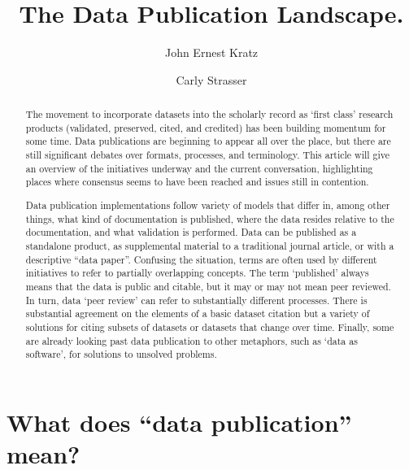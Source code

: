 \documentclass[10pt,a4paper,twocolumn]{article}
\begin{document}
\title{The Data Publication Landscape.}
\author[1]{John Ernest Kratz}
\author[1]{Carly Strasser}

\maketitle
\thispagestyle{fancy}


\begin{abstract}

The movement to incorporate datasets into the scholarly record as `first class' research products (validated, preserved, cited, and credited) has been building momentum for some time.
Data publications are beginning to appear all over the place, but there are still significant debates over formats, processes, and terminology.
This article will give an overview of the initiatives underway and the current conversation, highlighting places where consensus seems to have been reached and issues still in contention.

Data publication implementations follow variety of models that differ in, among other things, what kind of documentation is published, where the data resides relative to the documentation, and what validation is performed. Data can be published as a standalone product, as supplemental material to a traditional journal article, or with a descriptive ``data paper''.
Confusing the situation, terms are often used by different initiatives to refer to partially overlapping concepts.
The term `published' always means that the data is public and citable, but it may or may not mean peer reviewed.
In turn, data `peer review' can refer to substantially different processes.
There is substantial agreement on the elements of a basic dataset citation but a variety of solutions for citing subsets of datasets or datasets that change over time.
Finally, some are already looking past data publication to other metaphors, such as `data as software', for solutions to unsolved problems.

\end{abstract}
\clearpage


\section*{What does ``data publication'' mean?}\label{what-does-data-publication-mean}
\end{document}
